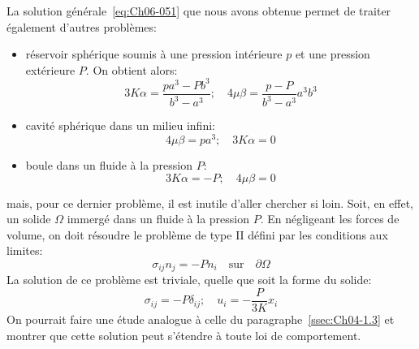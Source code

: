 La solution générale~\eqref{eq:Ch06-051} que nous avons obtenue permet de traiter également d'autres problèmes:
\begin{itemize}
    \item réservoir sphérique soumis à une pression intérieure $p$ et une pression extérieure $P$.
        On obtient alors:
        \begin{equation}
            3K\alpha = \frac{p a^3 - P b^3}{b^3 - a^3} ;\quad 4\mu\beta = \frac{p-P}{b^3-a^3}a^3 b^3
            \label{eq:Ch06-059}
        \end{equation}
    \item cavité sphérique dans un milieu infini:
        \begin{equation}
            4\mu\beta = p a^3; \quad 3 K \alpha = 0
            \label{eq:Ch06-060}
        \end{equation}
    \item boule dans un fluide à la pression $P$:
        \begin{equation}
            3K\alpha = -P;\quad 4 \mu\beta = 0
            \label{eq:Ch06-061}
        \end{equation}
\end{itemize}
mais, pour ce dernier problème, il est inutile d'aller chercher si loin.
Soit, en effet, un solide $\Omega$ immergé dans un fluide à la pression $P$.
En négligeant les forces de volume, on doit résoudre le problème de type II défini par les conditions aux limites:
\begin{equation}
    \sigma_{ij} n_j = -P n_i \quad \text{sur} \quad \partial \Omega
    \label{eq:Ch06-062}
\end{equation}
La solution de ce problème est triviale, quelle que soit la forme du solide:
\begin{equation}
    \sigma_{ij} = -P \delta_{ij}; \quad u_i = -\frac{P}{3K} x_i
    \label{eq:Ch06-063}
\end{equation}
On pourrait faire une étude analogue à celle du paragraphe~\ref{ssec:Ch04-1.3} et montrer que cette solution peut s'étendre à toute loi de comportement.
